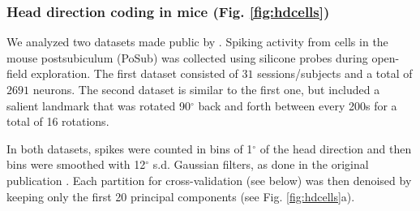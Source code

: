 








\subsubsection{Head direction coding in mice (Fig. \ref{fig:hdcells})}

We analyzed two datasets made public by \textcite{duszkiewicz}.
Spiking activity from cells in the mouse postsubiculum (PoSub) was collected using silicone probes during open-field exploration. 
The first dataset consisted of $31$ sessions/subjects and a total of $2691$ neurons. The second dataset is similar to the first one, but included a salient landmark that was rotated 90$^{\circ}$  back and forth between every 200s for a total of 16 rotations. 

In both datasets, spikes were counted in bins of 1$^{\circ}$ of the head direction and then bins were smoothed with 12$^{\circ}$  s.d. Gaussian filters, as done in the original publication \parencite{duszkiewicz}.
Each partition for cross-validation (see below) was then denoised by keeping only the first 20 principal components (see Fig. \ref{fig:hdcells}a).  

